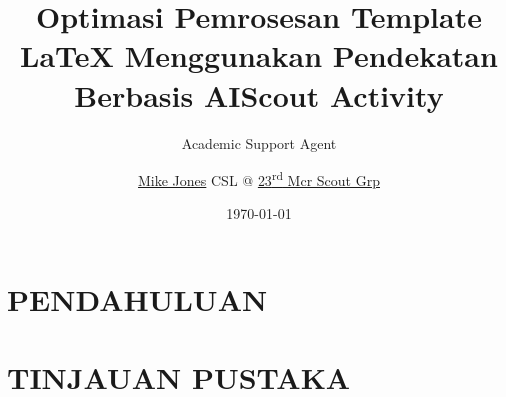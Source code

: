 \documentclass{GreyWolfsScoutActivityTemplate}
\title{Optimasi Pemrosesan Template LaTeX Menggunakan Pendekatan Berbasis AI}
\author{Academic Support Agent}
\date{\today}
\begin{document}
\maketitle

\begin{abstract}

\end{abstract}

\chapter{PENDAHULUAN}


\chapter{TINJAUAN PUSTAKA}



\usepackage{GreyWolfsScoutFleurDeLis} %
\usepackage{lipsum}
\title{Scout Activity} %
\author{\href{mailto:mike.jones@mansouthscouts.org.uk}{Mike Jones} CSL @ \href{http://23rdMcr.uk}{23\textsuperscript{rd} Mcr Scout Grp}}


\end{document}
